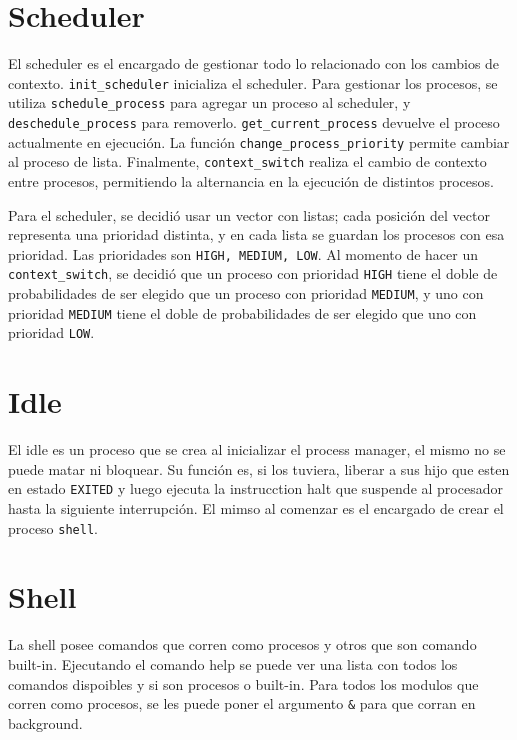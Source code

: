 \documentclass{article}
\begin{document}
\section {Scheduler}
El scheduler es el encargado de gestionar todo lo relacionado con los cambios de contexto. \texttt{init\_scheduler} inicializa el scheduler. Para gestionar los procesos, se utiliza \texttt{schedule\_process} para agregar un proceso al scheduler, y \texttt{deschedule\_process} para removerlo. \texttt{get\_current\_process} devuelve el proceso actualmente en ejecución. La función \texttt{change\_process\_priority} permite cambiar al proceso de lista. Finalmente, \texttt{context\_switch} realiza el cambio de contexto entre procesos, permitiendo la alternancia en la ejecución de distintos procesos.

Para el scheduler, se decidió usar un vector con listas; cada posición del vector representa una prioridad distinta, y en cada lista se guardan los procesos con esa prioridad. Las prioridades son \texttt{HIGH, MEDIUM, LOW}.
Al momento de hacer un \texttt{context\_switch}, se decidió que un proceso con prioridad \texttt{HIGH} tiene el doble de probabilidades de ser elegido que un proceso con prioridad \texttt{MEDIUM}, y uno con prioridad \texttt{MEDIUM} tiene el doble de probabilidades de ser elegido que uno con prioridad \texttt{LOW}.

\section {Idle}
El idle es un proceso que se crea al inicializar el process manager, el mismo no se puede matar ni bloquear. Su función es, si los tuviera, liberar a sus hijo que esten en estado \texttt{EXITED} y luego ejecuta la instrucction halt que suspende al procesador hasta la siguiente interrupción. El mimso al comenzar es el encargado de crear el proceso \texttt{shell}.

\section {Shell}
La shell posee comandos que corren como procesos y otros que son comando built-in. Ejecutando el comando help se puede ver una lista con todos los comandos dispoibles y si son procesos o built-in. Para todos los modulos que corren como procesos, se les puede poner el argumento \texttt{\&} para que corran en background.
\end{document}
